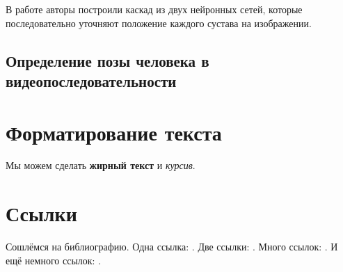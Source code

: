  В работе \cite{toshev2014deeppose} авторы построили каскад из двух нейронных сетей, которые последовательно уточняют положение каждого сустава на изображении.
 
 
 
\subsection{Определение позы человека в видеопоследовательности}

\def\slantfrac#1#2{ \hspace{3pt}\!^{#1}\!\!\hspace{1pt}/
	\hspace{2pt}\!\!_{#2}\!\hspace{3pt}
} %



\section{Форматирование текста} \label{sect1_1}

Мы можем сделать \textbf{жирный текст} и \textit{курсив}.


\section{Ссылки} \label{sect1_2}
Сошлёмся на библиографию. Одна ссылка: \cite[с.~54]{Sokolov}\cite[с.~36]{Gaidaenko}. Две ссылки: \cite{Sokolov,Gaidaenko}. Много ссылок:  \cite[с.~54]{Lermontov,Management,Borozda} \cite{Lermontov,Management,Borozda,Marketing,Constitution,FamilyCode,Gost.7.0.53,Razumovski,Lagkueva,Pokrovski,Sirotko,Lukina,Methodology,Encyclopedia,Nasirova,Berestova,Kriger}. И ещё немного ссылок: \cite{Article,Book,Booklet,Conference,Inbook,Incollection,Manual,Mastersthesis,Misc,Phdthesis,Proceedings,Techreport,Unpublished}. \cite{medvedev2006jelektronnye, CEAT:CEAT581, doi:10.1080/01932691.2010.513279,Gosele1999161,Li2007StressAnalysis, Shoji199895,test:eisner-sample,AB_patent_Pomerantz_1968,iofis_patent1960}


